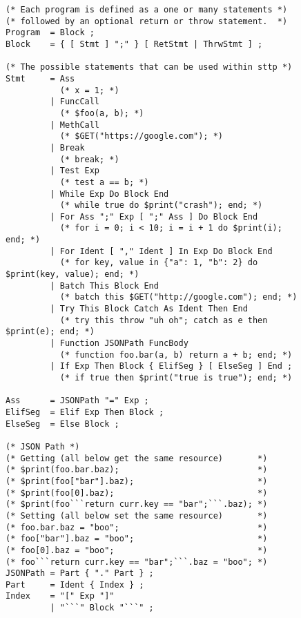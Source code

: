\begin{figure}[H]\ContinuedFloat
    \begin{verbatim}
(* Each program is defined as a one or many statements *)
(* followed by an optional return or throw statement.  *)
Program  = Block ;
Block    = { [ Stmt ] ";" } [ RetStmt | ThrwStmt ] ;

(* The possible statements that can be used within sttp *)
Stmt     = Ass
           (* x = 1; *)
         | FuncCall
           (* $foo(a, b); *)
         | MethCall
           (* $GET("https://google.com"); *)
         | Break
           (* break; *)
         | Test Exp
           (* test a == b; *)
         | While Exp Do Block End
           (* while true do $print("crash"); end; *)
         | For Ass ";" Exp [ ";" Ass ] Do Block End
           (* for i = 0; i < 10; i = i + 1 do $print(i); end; *)
         | For Ident [ "," Ident ] In Exp Do Block End
           (* for key, value in {"a": 1, "b": 2} do $print(key, value); end; *)
         | Batch This Block End
           (* batch this $GET("http://google.com"); end; *)
         | Try This Block Catch As Ident Then End
           (* try this throw "uh oh"; catch as e then $print(e); end; *)
         | Function JSONPath FuncBody
           (* function foo.bar(a, b) return a + b; end; *)
         | If Exp Then Block { ElifSeg } [ ElseSeg ] End ;
           (* if true then $print("true is true"); end; *)

Ass      = JSONPath "=" Exp ;
ElifSeg  = Elif Exp Then Block ;
ElseSeg  = Else Block ;

(* JSON Path *)
(* Getting (all below get the same resource)       *)
(* $print(foo.bar.baz);                            *)
(* $print(foo["bar"].baz);                         *)
(* $print(foo[0].baz);                             *)
(* $print(foo```return curr.key == "bar";```.baz); *)
(* Setting (all below set the same resource)       *)
(* foo.bar.baz = "boo";                            *)
(* foo["bar"].baz = "boo";                         *)
(* foo[0].baz = "boo";                             *)
(* foo```return curr.key == "bar";```.baz = "boo"; *)
JSONPath = Part { "." Part } ;
Part     = Ident { Index } ;
Index    = "[" Exp "]"
         | "```" Block "```" ;
    \end{verbatim}
\end{figure}

